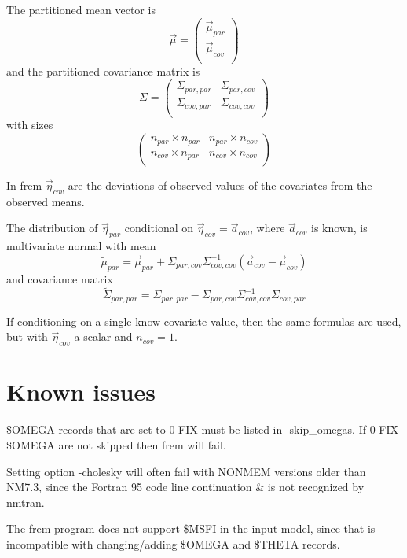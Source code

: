 The partitioned mean vector is
\[
\vec{\mu} = \left(
\begin{array}{c}
\vec{\mu}_{par} \\
\vec{\mu}_{cov}\\
\end{array}
\right)
\]
and the partitioned covariance matrix is
\[
\Sigma=\left(
\begin{array}{cc}
\Sigma_{par,par} & \Sigma_{par,cov}\\
\Sigma_{cov,par} & \Sigma_{cov,cov}\\
\end{array}
\right)
\]
with sizes
\[
\left(
\begin{array}{cc}
n_{par} \times n_{par} & n_{par} \times n_{cov}\\
n_{cov} \times n_{par} & n_{cov} \times n_{cov}\\
\end{array}
\right)
\]

In frem $\vec{\eta}_{cov}$ are the deviations of observed values of the covariates from the observed means.

The distribution of $\vec{\eta}_{par}$ conditional on $\vec{\eta}_{cov}= \vec{a}_{cov}$,
where $\vec{a}_{cov}$ is known,
is
multivariate normal with mean
\[
\tilde{\mu}_{par}=\vec{\mu}_{par}+\Sigma_{par,cov}\Sigma_{cov,cov}^{-1}\left(\vec{a}_{cov}-\vec{\mu}_{cov}\right)
\]
and covariance matrix
\[
\tilde{\Sigma}_{par,par}=\Sigma_{par,par}-\Sigma_{par,cov}\Sigma_{cov,cov}^{-1}\Sigma_{cov,par}
\]

If conditioning on a single know covariate value, then the same formulas are used, but with $\vec{\eta}_{cov}$ a scalar
and $n_{cov}=1$.


\section{Known issues}
\$OMEGA records that are set to 0 FIX must be listed in -skip\_omegas. If 0 FIX \$OMEGA are not skipped then
frem will fail.

Setting option -cholesky will often fail with NONMEM versions older than NM7.3, since the Fortran 95 code line continuation
\& is not recognized by nmtran.

The frem program does not support \$MSFI in the input model, since that is incompatible
with changing/adding \$OMEGA and \$THETA records.



